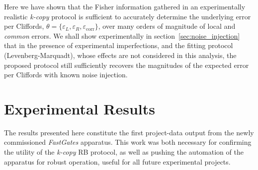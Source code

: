Here we have shown that the Fisher information gathered in an experimentally realistic \emph{k-copy} protocol is sufficient to accurately determine the underlying error per Cliffords, $\theta=\{\varepsilon_L, \varepsilon_R, \varepsilon_\mathrm{corr}\}$, over many orders of magnitude of local and \emph{common} errors. We shall show experimentally in section~\ref{sec:noise_injection} that in the presence of experimental imperfections, and the fitting protocol (Levenberg-Marquadt), whose effects are not considered in this analysis, the proposed protocol still sufficiently recovers the magnitudes of the expected error per Cliffords with known noise injection.



\section{Experimental Results}
\label{sec:results}
The results presented here constitute the first project-data output from
the newly commissioned \emph{FastGates} apparatus. This work was both necessary
for confirming the utility of the \emph{k-copy} RB protocol, as well as pushing
the automation of the apparatus for robust operation, useful for all future
experimental projects.\\


